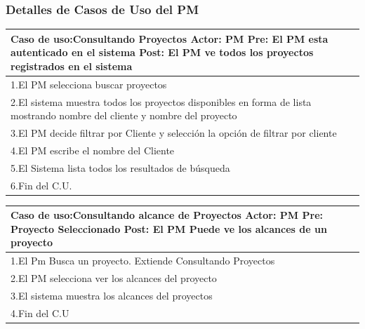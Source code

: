 \subsubsection{Detalles de Casos de Uso del PM}
\begin{longtable}{|p{}|p{}|}
    \hline
    \multicolumn{2}{|p{16cm}|}{
        \textbf{Caso de uso:}Consultando Proyectos\newline
        \textbf{Actor:} PM\newline
        \textbf{Pre: }El PM esta autenticado en el sistema\newline
        \textbf{Post:} El PM ve todos los proyectos registrados en el sistema
    }\\
    \hline
    1.El PM selecciona buscar proyectos& \\
    \hline
    2.El sistema muestra todos los proyectos disponibles en forma de lista mostrando nombre del cliente y nombre del proyecto &\\
    \hline
    3.El PM decide filtrar por Cliente y selección la opción de filtrar por cliente& \\
    \hline
    4.El PM escribe el nombre del Cliente& \\
    \hline
    5.El Sistema lista todos los resultados de búsqueda&\\
    \hline
    6.Fin del C.U.&\\
    \hline
\end{longtable}

\begin{longtable}{|p{}|p{}|}
    \hline
    \multicolumn{2}{|p{16cm}|}{
        \textbf{Caso de uso:}Consultando alcance de Proyectos\newline
        \textbf{Actor:} PM\newline
        \textbf{Pre: }Proyecto Seleccionado\newline
        \textbf{Post:} El PM Puede ve los alcances de un proyecto
    }\\
    \hline
    1.El Pm Busca un proyecto. Extiende Consultando Proyectos& \\
    \hline
    2.El PM selecciona ver los alcances del proyecto&  \\
    \hline
    3.El sistema muestra los alcances del proyectos& \\
    \hline
    4.Fin del C.U&\\
    \hline
\end{longtable}

